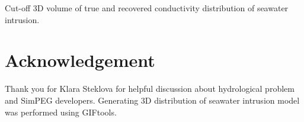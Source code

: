 \documentclass{segabs}
\begin{document}
{Cut-off 3D volume of true and recovered conductivity distribution of seawater intrusion.}





\section{Acknowledgement}
Thank you for Klara Steklova for helpful discussion about hydrological problem and  SimPEG developers. Generating 3D distribution of seawater intrusion model was performed using GIFtools.

\twocolumn
\onecolumn
% 

\end{document}
